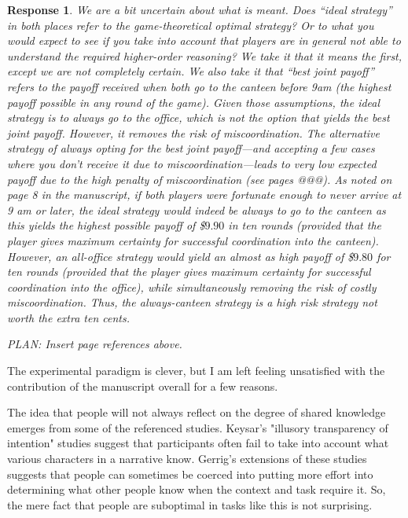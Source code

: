 \documentclass[a4paper]{article}
\newtheorem{response}{Response}
\begin{document}
\begin{response} 
We are a bit uncertain about what is meant. Does ``ideal strategy'' in both places refer to the game-theoretical optimal strategy? Or to what you would expect to see if you take into account that players are in general not able to understand the required higher-order reasoning? We take it that it means the first, except we are not completely certain. We also take it that ``best joint payoff'' refers to the payoff received when both go to the canteen before 9am (the highest payoff possible in any round of the game). Given those assumptions, the ideal strategy is to always go to the office, which is \emph{not} the option that yields the best joint payoff.  However, it removes the risk of miscoordination. The alternative strategy of always opting for the best joint payoff---and accepting a few cases where you don't receive it due to miscoordination---leads to very low expected payoff due to the high penalty of miscoordination (see pages @@@). As noted on page 8 in the manuscript, if both players were fortunate enough to never arrive at 9 am or later, the ideal strategy would indeed be always to go to the canteen as this yields the highest possible payoff of \$$9.90$ in ten rounds (provided that the player gives maximum certainty for successful coordination into the canteen). However, an all-office strategy would yield an almost as high payoff of \$$9.80$ for ten rounds (provided that the player gives maximum certainty for successful coordination into the office), while simultaneously removing the risk of costly miscoordination. Thus, the always-canteen strategy is a high risk strategy not worth the extra ten cents.

PLAN: Insert page references above. 
\end{response}

The experimental paradigm is clever, but I am left feeling unsatisfied with the contribution of the manuscript overall for a few reasons.

The idea that people will not always reflect on the degree of shared knowledge emerges from some of the referenced studies. Keysar's "illusory transparency of intention" studies suggest that participants often fail to take into account what various characters in a narrative know. Gerrig's extensions of these studies suggests that people can sometimes be coerced into putting more effort into determining what other people know when the context and task require it. So, the mere fact that people are suboptimal in tasks like this is not surprising.
\end{document}
